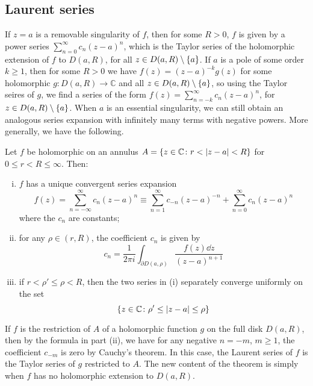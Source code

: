 \subsection{Laurent series}
If \( z = a \) is a removable singularity of \( f \), then for some \( R > 0 \), \( f \) is given by a power series \( \sum_{n = 0}^\infty c_n(z-a)^n \), which is the Taylor series of the holomorphic extension of \( f \) to \( D(a,R) \), for all \( z \in D(a,R) \setminus \qty{a} \).
If \( a \) is a pole of some order \( k \geq 1 \), then for some \( R > 0 \) we have \( f(z) = (z-a)^{-k} g(z) \) for some holomorphic \( g \colon D(a,R) \to \mathbb C \) and all \( z \in D(a,R) \setminus \qty{a} \), so using the Taylor seires of \( g \), we find a series of the form \( f(z) = \sum_{n=-k}^\infty c_n (z-a)^n \), for \( z \in D(a,R) \setminus \qty{a} \).
When \( a \) is an essential singularity, we can still obtain an analogous series expansion with infinitely many terms with negative powers.
More generally, we have the following.
\begin{theorem}
	Let \( f \) be holomorphic on an annulus \( A = \qty{z \in \mathbb C \colon r < \abs{z-a} < R} \) for \( 0 \leq r < R \leq \infty \).
	Then:
	\begin{enumerate}[(i)]
		\item \( f \) has a unique convergent series expansion
			\[ f(z) = \sum_{n = -\infty}^\infty c_n (z-a)^n \equiv \sum_{n=1}^\infty c_{-n} (z-a)^{-n} + \sum_{n=0}^\infty c_n (z-a)^n \]
			where the \( c_n \) are constants;
		\item for any \( \rho \in (r,R) \), the coefficient \( c_n \) is given by
			\[ c_n = \frac{1}{2 \pi i} \int_{\partial D(a,\rho)} \frac{f(z) \dd{z}}{(z-a)^{n+1}} \]
		\item if \( r < \rho' \leq \rho < R \), then the two series in (i) separately converge uniformly on the set
			\[ \qty{z \in \mathbb C \colon \rho' \leq \abs{z-a} \leq \rho} \]
	\end{enumerate}
\end{theorem}
\begin{remark}
	If \( f \) is the restriction of \( A \) of a holomorphic function \( g \) on the full disk \( D(a,R) \), then by the formula in part (ii), we have for any negative \( n = -m \), \( m \geq 1 \), the coefficient \( c_{-m} \) is zero by Cauchy's theorem.
	In this case, the Laurent series of \( f \) is the Taylor series of \( g \) restricted to \( A \).
	The new content of the theorem is simply when \( f \) has no holomorphic extension to \( D(a,R) \).
\end{remark}
